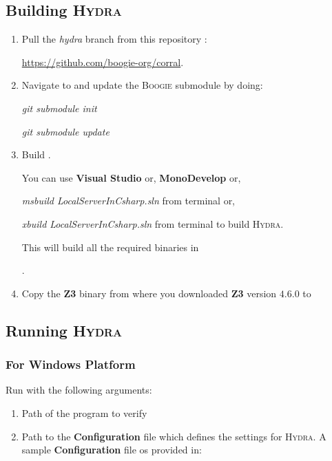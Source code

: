 \documentclass{article}
\begin{document}
\subsection{Building \textsc{Hydra}}
\begin{enumerate}
  \item Pull the \textit{hydra} branch from this repository :
  \par
  \noindent
  \url{https://github.com/boogie-org/corral}.
  \item Navigate to  and update the \textsc{Boogie} submodule by doing:
        \par
        \noindent
        \textit{git submodule init}
        \par
        \noindent
        \textit{git submodule update}
  \item Build .
        \par
        \noindent
   You can use \textbf{Visual Studio} or, \textbf{MonoDevelop} or,
        \par
        \noindent
   \textit{msbuild LocalServerInCsharp.sln} from terminal or,
        \par
        \noindent
   \textit{xbuild LocalServerInCsharp.sln} from terminal to build \textsc{Hydra}.
        \par
        \noindent
   This will build all the required binaries in
        \par
        \noindent
   .
   \item Copy the \textbf{Z3} binary from where you downloaded \textbf{Z3} version $4.6.0$ to
        \par
        \noindent
\end{enumerate}
\subsection{Running \textsc{Hydra}}
\subsubsection{For Windows Platform}
Run  with the following arguments:
\begin{enumerate}
  \item Path of the program to verify
  \item Path to the \textbf{Configuration} file which defines the settings for \textsc{Hydra}. A sample \textbf{Configuration} file os provided in:
  \par
  \noindent
\end{enumerate}
\end{document}
